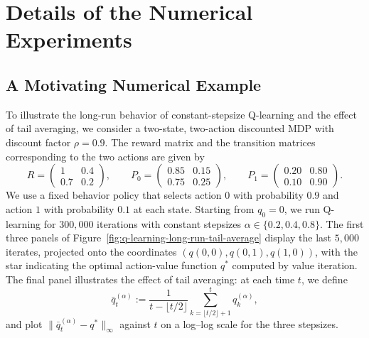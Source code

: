 \documentclass[11pt,letterpaper]{article}
\theoremstyle{plain}
\theoremstyle{definition}
\theoremstyle{remark}
\begin{document}
\section{Details of the Numerical Experiments}


\subsection{A Motivating Numerical Example}\label{sec:experiment-intro}
To illustrate the long-run behavior of constant-stepsize Q-learning and the
effect of tail averaging, we consider a two-state, two-action discounted MDP
with discount factor $\rho=0.9$. The reward matrix and the transition
matrices corresponding to the two actions are given by
\[
R=
\begin{pmatrix}
1 & 0.4\\
0.7 & 0.2
\end{pmatrix},
\qquad
P_0=
\begin{pmatrix}
0.85 & 0.15\\
0.75 & 0.25
\end{pmatrix},
\qquad
P_1=
\begin{pmatrix}
0.20 & 0.80\\
0.10 & 0.90
\end{pmatrix}.
\]
We use a fixed behavior policy that selects action $0$ with probability $0.9$
and action $1$ with probability $0.1$ at each state. Starting from
$q_0=0$, we run Q-learning for $300{,}000$ iterations with constant stepsizes
$\alpha\in\{0.2,0.4,0.8\}$. The first three panels of
Figure~\ref{fig:q-learning-long-run-tail-average} display the last $5{,}000$
iterates, projected onto the coordinates
$(q(0,0),q(0,1),q(1,0))$, with the star indicating the optimal action-value
function $q^*$ computed by value iteration. The final panel illustrates the
effect of tail averaging: at each time $t$, we define
\[
    \bar q_t^{(\alpha)}
    :=
    \frac{1}{t-\lfloor t/2\rfloor}
    \sum_{k=\lfloor t/2\rfloor+1}^{t} q_k^{(\alpha)},
\]
and plot $\bigl\|\bar q_t^{(\alpha)}-q^*\bigr\|_\infty$ against $t$ on a log--log scale for
the three stepsizes.
\end{document}
